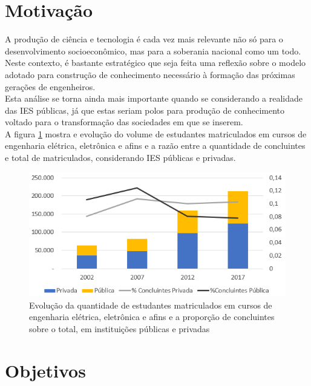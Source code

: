 	

	\section{Motivação}

		A produção de ciência e tecnologia é cada vez mais relevante não só para o desenvolvimento socioeconômico, mas para a soberania nacional como um todo. Neste contexto, é bastante estratégico que seja feita uma reflexão sobre o modelo adotado para construção de conhecimento necessário à formação das próximas gerações de engenheiros.\\
		
		Esta análise se torna ainda mais importante quando se considerando a realidade das IES públicas, já que estas seriam polos para produção de conhecimento voltado para o transformação das sociedades em que se inserem.\\
		
		A figura \ref{fig:evolucaomatriculadosconcluintes} mostra e evolução do volume de estudantes matriculados em cursos de engenharia elétrica, eletrônica e afins e a razão entre a quantidade de concluintes e total de matriculados, considerando IES públicas e privadas.
		
		\begin{figure}[h!]
			\centering
			\includegraphics[width=0.75\linewidth]{Figuras/evolucao_matriculados_concluintes}
			\caption[Evolução de matriculados em cursos de engenharia elétrica, eletrônica e afins]{Evolução da quantidade de estudantes matriculados em cursos de engenharia elétrica, eletrônica e afins e a proporção de concluintes sobre o total, em instituições públicas e privadas}
			\label{fig:evolucaomatriculadosconcluintes}
		\end{figure}
		
		
		
	\section{Objetivos}
	
